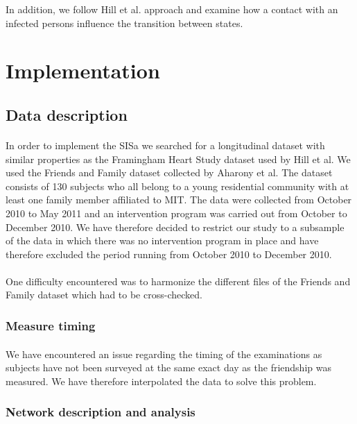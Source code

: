 \documentclass[11pt]{article}
\begin{document}
In addition, we follow Hill et al. approach and examine how a contact with an infected persons influence the transition between states.

\section{Implementation}

\subsection{Data description}
\paragraph{}
In order to implement the SISa we searched for a longitudinal dataset with similar properties as the Framingham Heart Study dataset used by Hill et al. We used the Friends and Family dataset collected by Aharony et al. The dataset consists of 130 subjects who all belong to a young residential community with at least one family member affiliated to MIT. The data were collected from October 2010 to May 2011 and an intervention program was carried out from October to December 2010. We have therefore decided to restrict our study to a subsample of the data in which there was no intervention program in place and have therefore excluded the period running from October 2010 to December 2010. 

\paragraph{}

One difficulty encountered was to harmonize the different files of the Friends and Family dataset which had to be cross-checked.

\subsubsection{Measure timing}
\paragraph{}
We have encountered an issue regarding the timing of the examinations as subjects have not been surveyed at the same exact day as the friendship was measured. We have therefore interpolated the data to solve this problem.

\subsubsection{Network description and analysis}
\end{document}
